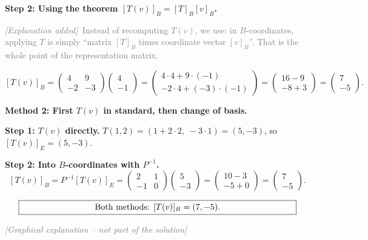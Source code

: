 \documentclass[a4paper,12pt]{article}
\newcommand{\grafik}{\textcolor{gray}{\small\textit{[Graphical explanation -- not part of the solution]}}}
\newcommand{\erglerk}{\textcolor{gray}{\small\textit{[Explanation added]}}}
\begin{document}
\textbf{Step 2: Using the theorem $[T(v)]_B = [T]_B [v]_B$.}

\erglerk\ \textcolor{gray}{\small Instead of recomputing $T(v)$, we use: in $B$-coordinates, applying $T$ is simply ``matrix $[T]_B$ times coordinate vector $[v]_B$''. That is the whole point of the representation matrix.}

\[
[T(v)]_B = \begin{pmatrix} 4 & 9 \\ -2 & -3 \end{pmatrix}\begin{pmatrix} 4 \\ -1 \end{pmatrix}
= \begin{pmatrix} 4\cdot 4 + 9\cdot(-1) \\ -2\cdot 4 + (-3)\cdot(-1) \end{pmatrix}
= \begin{pmatrix} 16 - 9 \\ -8 + 3 \end{pmatrix}
= \begin{pmatrix} 7 \\ -5 \end{pmatrix}.
\]

\bigskip

\textbf{Method 2: First $T(v)$ in standard, then change of basis.}

\textbf{Step 1: $T(v)$ directly.} $T(1,2) = (1 + 2\cdot 2,\; -3\cdot 1) = (5, -3)$, so $[T(v)]_E = (5, -3)$.

\textbf{Step 2: Into $B$-coordinates with $P^{-1}$.}
\[
[T(v)]_B = P^{-1} [T(v)]_E = \begin{pmatrix} 2 & 1 \\ -1 & 0 \end{pmatrix}\begin{pmatrix} 5 \\ -3 \end{pmatrix}
= \begin{pmatrix} 10 - 3 \\ -5 + 0 \end{pmatrix}
= \begin{pmatrix} 7 \\ -5 \end{pmatrix}.
\]

\[
\fbox{\parbox{0.93\textwidth}{\centering
Both methods: $[T(v)]_B = (7, -5)$.
}}
\]

\grafik

\begin{center}
\end{center}
\end{document}
